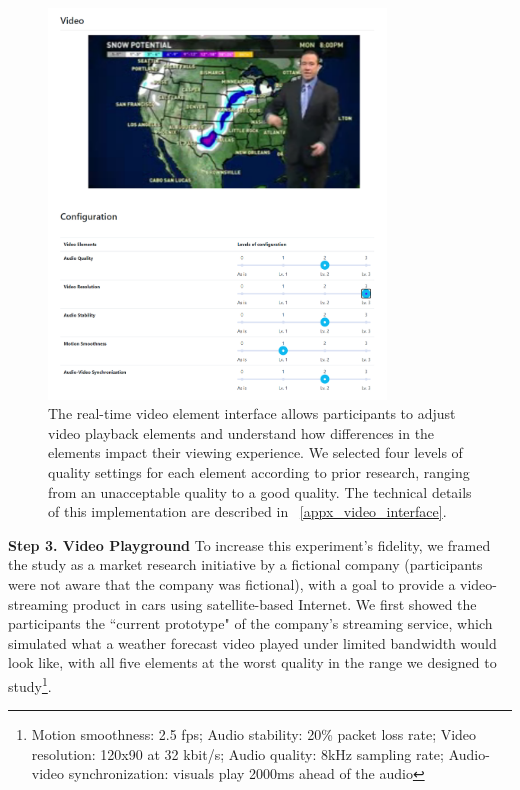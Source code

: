 \begin{figure}[htpb]
    \centering
    \includegraphics[width=0.8\textwidth, keepaspectratio=true]{content/image/video_playground.png}
    \caption{
        The real-time video element interface allows participants to adjust video playback elements and understand how differences in the elements impact their viewing experience. We selected four levels of quality settings for each element according to prior research, ranging from an unacceptable quality to a good quality. The technical details of this implementation are described in ~\cref{appx_video_interface}.
    }
    \label{fig:exp2_playground}
\end{figure}


\textbf{Step 3. Video Playground} To increase this experiment's fidelity, we framed the study as a market research initiative by a fictional company (participants were not aware that the company was fictional), with a goal to provide a video-streaming product in cars using satellite-based Internet. We first showed the participants the ``current prototype" of the company's streaming service, which simulated what a weather forecast video played under limited bandwidth would look like, with all five elements at the worst quality in the range we designed to study\footnote{Motion smoothness: 2.5 fps; Audio stability: 20\% packet loss rate; Video resolution: 120x90 at 32 kbit/s; Audio quality: 8kHz sampling rate; Audio-video synchronization: visuals play 2000ms ahead of the audio}. 

